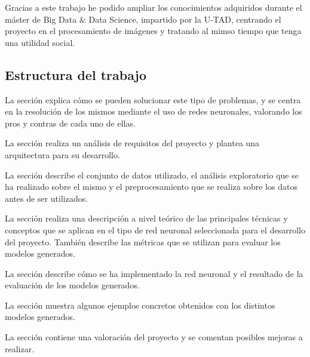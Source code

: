 Gracias a este trabajo he podido ampliar los conocimientos adquiridos durante el máster de Big Data \& Data Science, impartido por la U-TAD, centrando el proyecto en el procesamiento de imágenes y tratando al mimso tiempo que tenga una utilidad social.


\subsection{Estructura del trabajo}

La sección \textit{} explica cómo se pueden solucionar este tipo de problemas, y se centra en la resolución de los mismos mediante el uso de redes neuronales, valorando los pros y contras de cada uno de ellas.

La sección \textit{} realiza un análisis de requisitos del proyecto y plantea una arquitectura para su desarrollo.

La sección \textit{} describe el conjunto de datos utilizado, el análisis exploratorio que se ha realizado sobre el mismo y el preprocesamiento que se realiza sobre los datos antes de ser utilizados.

La sección \textit{} realiza una descripción a nivel teórico de las principales técnicas y conceptos que se aplican en el tipo de red neuronal seleccionada para el desarrollo del proyecto. También describe las métricas que se utilizan para evaluar los modelos generados.

La sección \textit{} describe cómo se ha implementado la red neuronal y el resultado de la evaluación de los modelos generados.

La sección \textit{} muestra algunos ejemplos concretos obtenidos con los distintos modelos generados.

La sección \textit{} contiene una valoración del proyecto y se comentan posibles mejoras a realizar.

